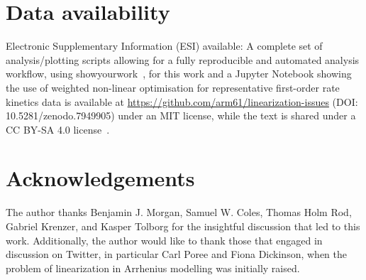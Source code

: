\documentclass[journal=jceda8,manuscript=article]{achemso}
\begin{document}
\section*{Data availability}

Electronic Supplementary Information (ESI) available: A complete set of analysis/plotting scripts allowing for a fully reproducible and automated analysis workflow, using showyourwork~\cite{luger_showyourwork_2021}, for this work and a Jupyter Notebook showing the use of weighted non-linear optimisation for representative first-order rate kinetics data is available at \url{https://github.com/arm61/linearization-issues} (DOI: 10.5281/zenodo.7949905) under an MIT license, while the text is shared under a CC BY-SA 4.0 license~\cite{mccluskey_github_2023}.

\section*{Acknowledgements}

The author thanks Benjamin J. Morgan, Samuel W. Coles, Thomas Holm Rod, Gabriel Krenzer, and Kasper Tolborg for the insightful discussion that led to this work. 
Additionally, the author would like to thank those that engaged in discussion on Twitter, in particular Carl Poree and Fiona Dickinson, when the problem of linearization in Arrhenius modelling was initially raised. 


\end{document}
